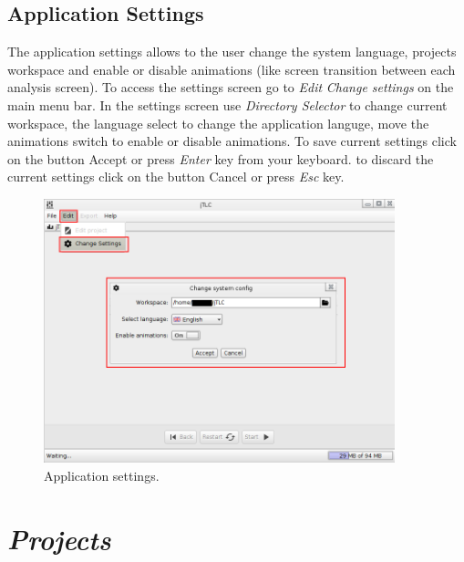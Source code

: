 \section{Application Settings}
The application settings allows to the user change the system language, projects workspace and enable or disable animations (like screen transition between each analysis screen). To access the settings screen go to \emph{Edit}  \emph{Change settings} on the main menu bar.
In the settings screen use \emph{Directory Selector} to change current workspace, the language select to change the application languge, move the animations switch to enable or disable animations. To save current settings click on the button Accept or press \emph{Enter} key from your keyboard. to discard the current settings click on the button Cancel or press \emph{Esc} key.

\begin{figure}[H]
	\vspace{0cm}
	\centering
	\includegraphics[width=385px]{imagenes/settings}
	\centering
	\vspace{-0.4cm}
	\caption{Application settings.}
	\label{fig:settings}
	\vspace{-0.25cm}
\end{figure}
\newpage

\chapter{\textit{Projects}}
